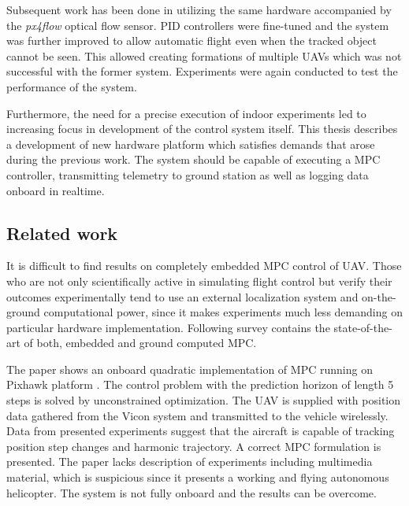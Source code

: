 Subsequent work has been done in \citep{endrych2014} utilizing the same hardware accompanied by the \textit{px4flow} optical flow sensor. PID controllers were fine-tuned and the system was further improved to allow automatic flight even when the tracked object cannot be seen. This allowed creating formations of multiple UAVs which was not successful with the former system. Experiments were again conducted to test the performance of the system.

Furthermore, the need for a precise execution of indoor experiments led to increasing focus in development of the control system itself. This thesis describes a development of new hardware platform which satisfies demands that arose during the previous work. The system should be capable of executing a MPC controller, transmitting telemetry to ground station as well as logging data onboard in realtime. 

\subsection{Related work}
\label{cap:related_work}

It is difficult to find results on completely embedded MPC control of UAV. Those who are not only scientifically active in simulating flight control but verify their outcomes experimentally tend to use an external localization system and on-the-ground computational power, since it makes experiments much less demanding on particular hardware implementation. Following survey contains the state-of-the-art of both, embedded and ground computed MPC.

The paper \citep{bangura2014realtimempc} shows an onboard quadratic implementation of MPC running on Pixhawk platform \citep{pixhawk}. The control problem with the prediction horizon of length 5 steps is solved by unconstrained optimization. The UAV is supplied with position data gathered from the Vicon system and transmitted to the vehicle wirelessly. Data from presented experiments suggest that the aircraft is capable of tracking position step changes and harmonic trajectory. A correct MPC formulation is presented. The paper lacks description of experiments including multimedia material, which is suspicious since it presents a working and flying autonomous helicopter. The system is not fully onboard and the results can be overcome.

